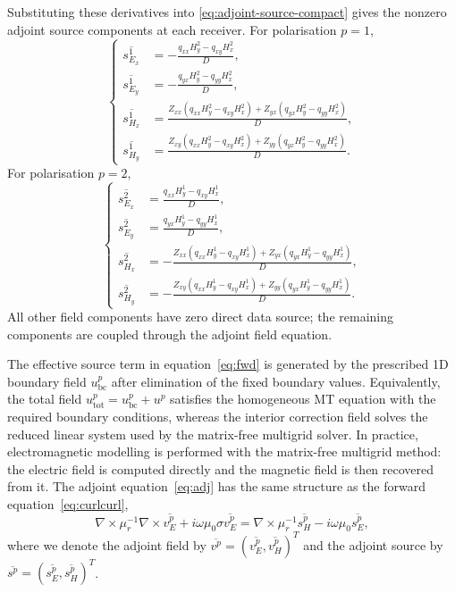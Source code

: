 \documentclass{article}
\begin{document}
Substituting these derivatives into \eqref{eq:adjoint-source-compact} gives the nonzero adjoint source components at each receiver. For polarisation $p=1$,
\begin{equation}
\left\{
\begin{aligned}
\overline{s_{E_x}^1} &=-\frac{q_{xx}H_y^2-q_{xy}H_x^2}{D},\\
\overline{s_{E_y}^1} &=-\frac{q_{yx}H_y^2-q_{yy}H_x^2}{D},\\
\overline{s_{H_x}^1} &=\frac{Z_{xx}(q_{xx}H_y^2-q_{xy}H_x^2)+Z_{yx}(q_{yx}H_y^2-q_{yy}H_x^2)}{D},\\
\overline{s_{H_y}^1} &=\frac{Z_{xy}(q_{xx}H_y^2-q_{xy}H_x^2)+Z_{yy}(q_{yx}H_y^2-q_{yy}H_x^2)}{D}.
\end{aligned}
\right.
\end{equation}
For polarisation $p=2$,
\begin{equation}
\left\{
\begin{aligned}
\overline{s_{E_x}^2} &=\frac{q_{xx}H_y^1-q_{xy}H_x^1}{D},\\
\overline{s_{E_y}^2} &=\frac{q_{yx}H_y^1-q_{yy}H_x^1}{D},\\
\overline{s_{H_x}^2} &=-\frac{Z_{xx}(q_{xx}H_y^1-q_{xy}H_x^1)+Z_{yx}(q_{yx}H_y^1-q_{yy}H_x^1)}{D},\\
\overline{s_{H_y}^2} &=-\frac{Z_{xy}(q_{xx}H_y^1-q_{xy}H_x^1)+Z_{yy}(q_{yx}H_y^1-q_{yy}H_x^1)}{D}.
\end{aligned}
\right.
\end{equation}
All other field components have zero direct data source; the remaining components are coupled through the adjoint field equation.

The effective source term in equation~\eqref{eq:fwd} is generated by the prescribed 1D boundary field $u_{\mathrm{bc}}^p$ after elimination of the fixed boundary values. Equivalently, the total field $u_{\mathrm{tot}}^p = u_{\mathrm{bc}}^p + u^p$ satisfies the homogeneous MT equation with the required boundary conditions, whereas the interior correction field solves the reduced linear system used by the matrix-free multigrid solver. In practice, electromagnetic modelling is performed with the matrix-free multigrid method: the electric field is computed directly and the magnetic field is then recovered from it. The adjoint equation~\eqref{eq:adj} has the same structure as the forward equation~\eqref{eq:curlcurl},
\begin{equation}
\nabla\times\mu_r^{-1} \nabla \times \overline{v_E^p} + i\omega\mu_0\sigma \overline{v_E^p} = \nabla\times\mu_r^{-1} \overline{s_H^p} - i\omega\mu_0 \overline{s_E^p},
\end{equation}
where we denote the adjoint field by $\overline{v^p}=(\overline{v_E^p}, \overline{v_H^p})^T$ and the adjoint source by $\overline{s^p}=(\overline{s_E^p}, \overline{s_H^p})^T$.
\end{document}
